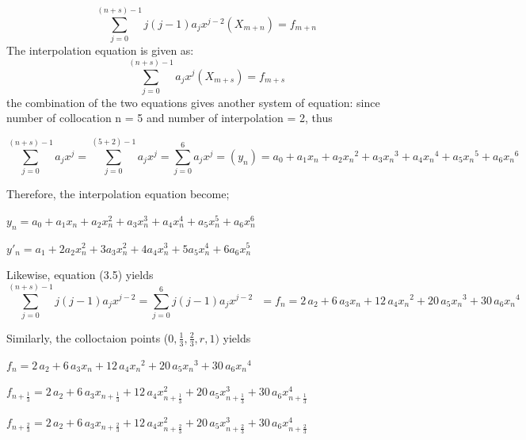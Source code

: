 \documentclass[12pt]{article}
\begin{document}
\begin{equation}
\sum_{j=0}^{(n+s)-1} j(j-1)a_{j}x^{j-2}(X_{m+n})= f_{m+n}
\end{equation}
The interpolation equation is given as:
\begin{equation}
\sum_{j=0}^{(n+s)-1} a_{j}x^{j}(X_{m+s})= f_{m+s}
\end{equation}
the combination of the two equations gives another system of equation:
since number of collocation n = 5 and number of interpolation = 2, thus

\begin{equation}
\sum_{j=0}^{(n+s)-1} a_{j}x^{j}= \sum_{j=0}^{(5+2)-1} a_{j}x^{j}=\sum_{j=0}^{6} a_{j}x^{j}=(y_{n})= a_{{0}}+a_{{1}} x_{{n}}+a_{{2}} {x_{{n}}}^{2}+a_{{3}} {
	x_{{n}}}^{3}+a_{{4}} {x_{{n}}}^{4}+a_{{5}} {x_{{n}}}^{5}+a_{
	{6}} {x_{{n}}}^{6}
\end{equation}

Therefore, the interpolation equation become;

$y_{n}=a_{0}+a_{1}x_{n}+a_{2}x^{2}_{n}+a_{3}x^{3}_{n}+a_{4}x^{4}_{n}+a_{5}x^{5}_{n}+a_{6}x^{6}_{n}$
\vspace{10pt}

$y'_{n}=a_{1}+2a_{2}x^{2}_{n}+3a_{3}x^{2}_{n}+4a_{4}x^{3}_{n}+5a_{5}x^{4}_{n}+6a_{6}x^{5}_{n}$
\vspace{10pt}


\vspace{10pt}

\noindent Likewise, equation (3.5) yields
$$\sum_{j=0}^{(n+s)-1} j(j-1)a_{j}x^{j-2}=\sum_{j=0}^{6} j(j-1)a_{j}x^{j-2} \ \ \ = f_n = 2\,a_{{2}}+6\,a_{{3}} x_{{n}}+12\,a_{{4}} {x_{{n}}}^{2}+20\,
a_{{5}} {x_{{n}}}^{3}+30\,a_{{6}} {x_{{n}}}^{4}
$$

\noindent Similarly, the colloctaion points ($0, \frac{1}{3},\frac{2}{3}, r, 1)$ yields

\vspace{10pt}
$f_n = 2\,a_{{2}}+6\,a_{{3}} x_{{n}}+12\,a_{{4}} {x_{{n}}}^{2}+20\,
a_{{5}} {x_{{n}}}^{3}+30\,a_{{6}} {x_{{n}}}^{4}$

\vspace{10pt}
$f_{n+\frac{1}{3}} = 2\,a_{2}+6\,a_{3} x_{{n+\frac{1}{3}}}+12\,a_{{4}}{x^{2}_{{n+\frac{1}{3}}}}+20\,
a_{{5}} {x^{3}_{{n+\frac{1}{3}}}}+30\,a_{{6}} {x^{4}_{{n+\frac{1}{3}}}}$


\vspace{10pt}
$f_{n+\frac{2}{3}} = 2\,a_{2}+6\,a_{3} x_{{n+\frac{2}{3}}}+12\,a_{{4}}{x^{2}_{{n+\frac{2}{3}}}}+20\,
a_{{5}} {x^{3}_{{n+\frac{2}{3}}}}+30\,a_{{6}} {x^{4}_{{n+\frac{2}{3}}}}$
\end{document}
